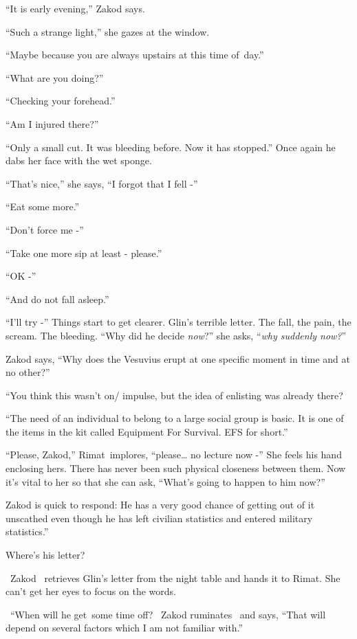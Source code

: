 \documentclass[12pt]{book}
\begin{document}
{}``It is early evening,'' Zakod says.

{}``Such a strange light,'' she gazes at the window.

{}``Maybe because you are always upstairs at this time of~day.''

{}``What are you doing?''

{}``Checking your forehead.''

{}``Am I injured there?''

{}``Only a small cut. It was bleeding before. Now it has stopped.'' Once again he dabs her face with the wet sponge.

{}``That's nice,'' she says, ``I forgot that I fell -''

{}``Eat some more.''

{}``Don't force me -''

{}``Take one more sip at least - please.''

{}``OK -''

{}``And do not fall asleep.''

{}``I'll try -'' Things start to get clearer. Glin's terrible letter. The fall, the pain, the scream. The bleeding.
``Why did he decide \textit{now}?'' she asks, ``\textit{why suddenly now?}{}''

Zakod says, ``Why does the Vesuvius erupt at one specific moment in time and at no other?''

{}``You think this wasn't on/ impulse, but the idea of enlisting was already there?{\textquotedbl}

{}``The need of an individual to belong to a large social group is basic. It is one of the items in the kit called
Equipment For Survival. EFS for short.''

{}``Please, Zakod,'' Rimat~implores, ``please{\dots} no lecture now -'' She feels his hand enclosing hers. There has
never been such physical closeness{ }between them. Now it's vital to her so that she can ask, ``What's
going to happen to him now?''

Zakod is quick to respond: {\textquotedbl}He has a very good chance of getting out of it unscathed even though he has
left civilian statistics and entered military statistics.''

{\textquotedbl}Where's his letter?{\textquotedbl}

~Zakod~ retrieves Glin's letter from the night table and hands it to Rimat. She can't get her eyes to focus on the
words.

\ {}``When will he get~some time off?{\textquotedbl} \ Zakod ruminates \ and says, ``That will depend on several factors
which I am not familiar with.'' \
\end{document}
